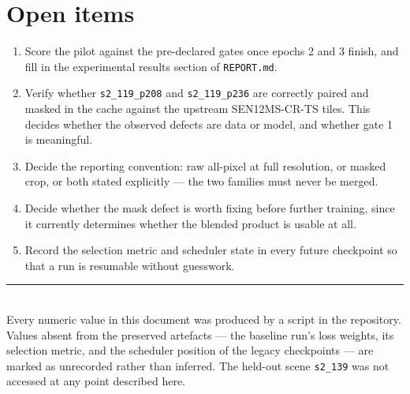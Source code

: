 \documentclass[10pt,a4paper]{article}
\newcommand{\code}[1]{\texttt{#1}}
\begin{document}
\section{Open items}

\begin{enumerate}
\item Score the pilot against the pre-declared gates once epochs 2 and 3 finish, and fill in the
      experimental results section of \code{REPORT.md}.
\item Verify whether \code{s2\_119\_p208} and \code{s2\_119\_p236} are correctly paired and
      masked in the cache against the upstream SEN12MS-CR-TS tiles. This decides whether the
      observed defects are data or model, and whether gate 1 is meaningful.
\item Decide the reporting convention: raw all-pixel at full resolution, or masked crop, or both
      stated explicitly --- the two families must never be merged.
\item Decide whether the mask defect is worth fixing before further training, since it currently
      determines whether the blended product is usable at all.
\item Record the selection metric and scheduler state in every future checkpoint so that a run is
      resumable without guesswork.
\end{enumerate}

\vfill
\noindent\rule{\textwidth}{0.3pt}\\
\footnotesize
Every numeric value in this document was produced by a script in the repository. Values absent
from the preserved artefacts --- the baseline run's loss weights, its selection metric, and the
scheduler position of the legacy checkpoints --- are marked as unrecorded rather than inferred.
The held-out scene \code{s2\_139} was not accessed at any point described here.
\end{document}
